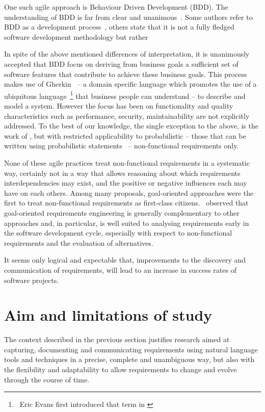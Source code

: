 \documentclass[dissertation,final]{softeng}
\begin{document}
One such agile approach is Behaviour Driven Development (BDD). The understanding of BDD is far from clear and unanimous~\citep{Solis0}. Some authors refer to BDD as a development process~\citep{Smart201410}, others state that it is not a fully fledged software development methodology but rather 

In spite of the above mentioned differences of interpretation, it is unanimously accepted that BDD focus on deriving from  business goals a sufficient set of software features that contribute to achieve these business goals. This process makes use of Gherkin~\citep{wynne2012cucumber} -- a domain specific language which promotes the use of a ubiquitous language~\footnote{~Eric Evans first introduced that term in  \citet{evans2004domain}}  that business people can understand -- to describe and model a system. However the focus has been on functionality and quality characteristics such as performance, security, maintainability are not explicitly addressed. To the best of our knowledge, the single exception to the above, is the work of \citet{barmi2011automated}, but with restricted applicability to probabilistic -- those that can be written using probabilistic statements~\citep{grunske2008specification} -- non-functional requirements only.

None of these agile practices treat non-functional requirements in a systematic way, certainly not in a way that allows reasoning about which requirements interdependencies may exist, and the positive or negative influences each may have on each others. Among many proposals, goal-oriented approaches were the first to treat non-functional requirements as first-class citizens.~\citet{Mylopoulos:1999jh} observed that goal-oriented requirements engineering is generally complementary to other approaches and, in particular, is well suited to analysing requirements early in the software development cycle, especially with respect to non-functional requirements and the evaluation of alternatives. 

It seems only logical and expectable that, improvements to the discovery and communication of requirements, will lead to an increase in success rates of software projects.

\section{Aim and limitations of study}
The context described in the previous section justifies research aimed at capturing, documenting and communicating requirements using natural language tools and techniques in a precise, complete and unambiguous way, but also with the flexibility and adaptability to allow requirements to change and evolve through the course of time.
\end{document}
